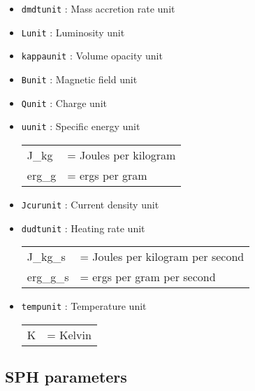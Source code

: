 \documentclass[a4paper]{article}
\newcommand{\var}[1]{\texttt{#1}}
\begin{document}
\begin{itemize}
\item \var{dmdtunit} : Mass accretion rate unit

\item \var{Lunit} : Luminosity unit

\item \var{kappaunit} : Volume opacity unit

\item \var{Bunit} : Magnetic field unit

\item \var{Qunit} : Charge unit

\item \var{uunit} : Specific energy unit \\
\begin{tabular}{ll}
J\_kg  & = Joules per kilogram \\
erg\_g & = ergs per gram
\end{tabular}

\item \var{Jcurunit} : Current density unit

\item \var{dudtunit} : Heating rate unit \\
\begin{tabular}{ll}
J\_kg\_s  & = Joules per kilogram per second \\
erg\_g\_s & = ergs per gram per second
\end{tabular}

\item \var{tempunit} : Temperature unit \\
\begin{tabular}{ll}
K & = Kelvin
\end{tabular}

\end{itemize}



\subsection{SPH parameters}
\end{document}
